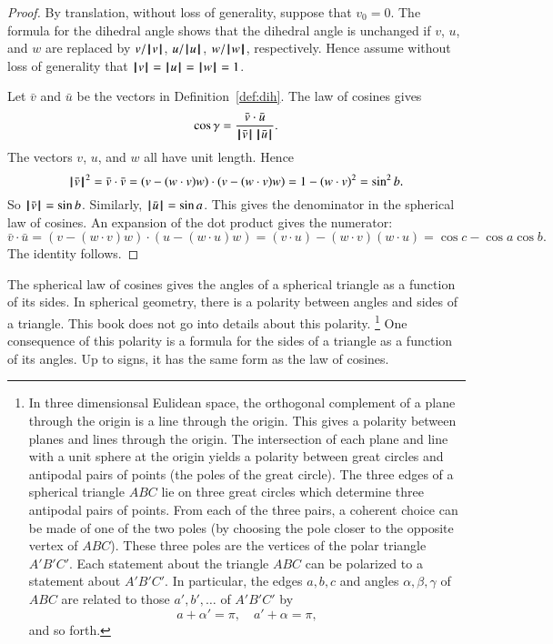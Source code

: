 \begin{proof}  By translation, without loss of generality, suppose that $v_0=0$.  
The formula for the dihedral angle shows that the
dihedral angle is unchanged if $v$, $u$, and $w$ are replaced
by $v/{{\hskip0.1em|\hskip-0.15em|\hskip0.1em}v{\hskip0.1em|\hskip-0.15em|\hskip0.1em}}$, $u/{{\hskip0.1em|\hskip-0.15em|\hskip0.1em}u{\hskip0.1em|\hskip-0.15em|\hskip0.1em}}$, $w/{{\hskip0.1em|\hskip-0.15em|\hskip0.1em}w{\hskip0.1em|\hskip-0.15em|\hskip0.1em}}$, respectively.  Hence assume without
loss of generality that ${{\hskip0.1em|\hskip-0.15em|\hskip0.1em}v{\hskip0.1em|\hskip-0.15em|\hskip0.1em}}={{\hskip0.1em|\hskip-0.15em|\hskip0.1em}u{\hskip0.1em|\hskip-0.15em|\hskip0.1em}}={{\hskip0.1em|\hskip-0.15em|\hskip0.1em}w{\hskip0.1em|\hskip-0.15em|\hskip0.1em}}=1$.

Let $\bar v$ and $\bar u$ be the vectors in Definition~\ref{def:dih}.
The law of cosines gives
        $$\cos\gamma = \frac{\bar v\cdot \bar u}{{{\hskip0.1em|\hskip-0.15em|\hskip0.1em}\bar v{\hskip0.1em|\hskip-0.15em|\hskip0.1em}}\,{{\hskip0.1em|\hskip-0.15em|\hskip0.1em}\bar u{\hskip0.1em|\hskip-0.15em|\hskip0.1em}}}.$$
The vectors $v$, $u$, and $w$ all have unit length.  Hence
        $$
        {{\hskip0.1em|\hskip-0.15em|\hskip0.1em}\bar v{\hskip0.1em|\hskip-0.15em|\hskip0.1em}}^2 = \bar v\cdot \bar v =
        (v - (w\cdot v)w)\cdot (v - (w\cdot v) w) =
        1 - (w\cdot v)^2 = \sin^2 b.
        $$
So ${{\hskip0.1em|\hskip-0.15em|\hskip0.1em}\bar v{\hskip0.1em|\hskip-0.15em|\hskip0.1em}} =\sin b$. Similarly, ${{\hskip0.1em|\hskip-0.15em|\hskip0.1em}\bar u{\hskip0.1em|\hskip-0.15em|\hskip0.1em}} = \sin a$.  This gives
the denominator in the spherical law of cosines.  An expansion of the dot product
gives the numerator:
    $$
    \bar v\cdot \bar u = (v - (w\cdot v) w)\cdot (u - (w\cdot u) w)
    = (v\cdot u) - (w\cdot v) (w\cdot u) = \cos c - \cos
    a \cos b.
    $$
The identity follows.
\end{proof}

The spherical law of cosines gives the angles of a spherical
triangle as a function of its sides.  In spherical geometry,
there is a polarity between angles and sides of a triangle.
This book does not go into details about this polarity.%
\footnote{In three dimensionsal Eulidean space, the orthogonal
complement of a plane through the origin is a line through
the origin.  This gives a polarity between planes and lines
through the origin.  The intersection of each plane and line with
a unit sphere at the origin yields a polarity between great
circles and antipodal
pairs of points (the poles of the great circle).  The three edges
of a spherical triangle $ABC$ lie on three great circles which
determine three
antipodal pairs of points.  From each of the three  pairs, 
a coherent
choice can be made of one of the two poles (by choosing the pole
closer to the opposite vertex of $ABC$).  
These three poles are the vertices
of the polar triangle $A'B'C'$.  Each statement about the triangle $ABC$
can be polarized to a statement about $A'B'C'$.
In particular, the edges $a,b,c$ and angles $\alpha,\beta,\gamma$ of $ABC$ 
are related to those $a',b',\ldots$ of $A'B'C'$ by
   $$
   a + \alpha' = \pi,\quad a' + \alpha= \pi,
   $$
and so forth.
}  
One
consequence of this polarity is a formula for the sides of
a triangle as a function of its angles.  Up to signs,
it has the same form as the law of cosines.

